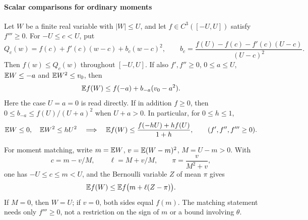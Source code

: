 \paragraph{Scalar comparisons for ordinary moments}
\label{part:oc:scalar-comparisons}

\begin{lemma}\label{lem:oc:hermite}
Let \(W\) be a finite real variable with \(|W|\le U\), and let
\(f\in C^3([-U,U])\) satisfy \(f'''\ge0\).
For \(-U\le c<U\), put
\begin{equation}\label{eq:oc:hermite-majorant}
 Q_c(w)=f(c)+f'(c)(w-c)+b_c(w-c)^2,\qquad
 b_c=\frac{f(U)-f(c)-f'(c)(U-c)}{(U-c)^2}.
\end{equation}
Then \(f(w)\le Q_c(w)\) throughout \([-U,U]\).
If also \(f',f''\ge0\), \(0\le a\le U\),
\(\mathbb E W\le-a\) and \(\mathbb E W^2\le v_0\), then
\begin{equation}\label{eq:oc:negative-contact}
 \mathbb E f(W)\le f(-a)+b_{-a}(v_0-a^2).
\end{equation}
Here the case \(U=a=0\) is read directly. If in addition \(f\ge0\),
then \(0\le b_{-a}\le f(U)/(U+a)^2\) when \(U+a>0\).
In particular, for \(0\le h\le1\),
\begin{equation}\label{eq:oc:fixed-contact}
 \mathbb E W\le0,\quad \mathbb E W^2\le hU^2
 \quad\Longrightarrow\quad
 \mathbb E f(W)\le\frac{f(-hU)+h f(U)}{1+h},
 \qquad(f',f'',f'''\ge0).
\end{equation}

For moment matching, write \(m=\mathbb E W\), \(v=\mathbb E(W-m)^2\),
\(M=U-m>0\). With
\begin{equation}\label{eq:oc:matched-contacts}
 c=m-v/M,\qquad \ell=M+v/M,\qquad
 \pi=\frac{v}{M^2+v},
\end{equation}
one has \(-U\le c\le m<U\), and the Bernoulli variable
\(Z\) of mean \(\pi\) gives
\begin{equation}\label{eq:oc:hermite-matching}
 \mathbb E f(W)\le \mathbb E f\bigl(m+\ell(Z-\pi)\bigr).
\end{equation}
If \(M=0\), then \(W=U\); if \(v=0\), both sides equal \(f(m)\).
The matching statement needs only \(f'''\ge0\), not a restriction
on the sign of \(m\) or a bound involving \(\theta\).
\end{lemma}
